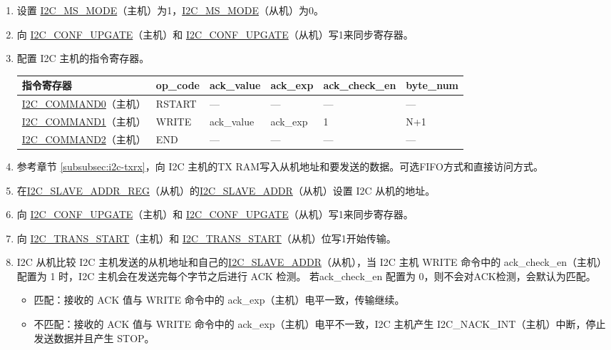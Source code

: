 \documentclass[main\_\_CN.tex]{subfiles}
\begin{document}
\begin{enumerate}
\item 设置 \hyperref[fielddesc:I2CMSMODE]{I2C\_MS\_MODE}（主机）为1，\hyperref[fielddesc:I2CMSMODE]{I2C\_MS\_MODE}（从机）为0。
\item 向 \hyperref[fielddesc:I2CCONFUPGATE]{I2C\_CONF\_UPGATE}（主机）和 \hyperref[fielddesc:I2CCONFUPGATE]{I2C\_CONF\_UPGATE}（从机）写1来同步寄存器。
\item 配置 I2C 主机的指令寄存器。
\begin{longtable}{ | p{4cm} | p{2cm} | p{2cm} | p{2cm} |p{2cm} | p{2cm} |}
\hline\rowcolor{lightgray}
指令寄存器& op\_code & ack\_value&ack\_exp&ack\_check\_en&byte\_num  \\ \hline
\hyperref[fielddesc:I2CCOMMAND0]{I2C\_COMMAND0}（主机）& RSTART& ---&---&---&---  \\ \hline
\hyperref[fielddesc:I2CCOMMAND1]{I2C\_COMMAND1}（主机）& WRITE& ack\_value&ack\_exp&1&N+1  \\ \hline
\hyperref[fielddesc:I2CCOMMAND2]{I2C\_COMMAND2}（主机）& END& ---&---&---&---  \\ \hline
\end{longtable}
\item 参考章节 \ref{subsubsec:i2c-txrx}，向 I2C 主机的TX RAM写入从机地址和要发送的数据。可选FIFO方式和直接访问方式。
\item 在\hyperref[regdesc:I2CSLAVEADDRREG]{I2C\_SLAVE\_ADDR\_REG}（从机）的\hyperref[fielddesc:I2CSLAVEADDR]{I2C\_SLAVE\_ADDR}（从机）设置 I2C 从机的地址。
\item 向 \hyperref[fielddesc:I2CCONFUPGATE]{I2C\_CONF\_UPGATE}（主机）和 \hyperref[fielddesc:I2CCONFUPGATE]{I2C\_CONF\_UPGATE}（从机）写1来同步寄存器。
\item 向 \hyperref[fielddesc:I2CTRANSSTART]{I2C\_TRANS\_START}（主机）和 \hyperref[fielddesc:I2CTRANSSTART]{I2C\_TRANS\_START}（从机）位写1开始传输。
\item I2C 从机比较 I2C 主机发送的从机地址和自己的\hyperref[fielddesc:I2CSLAVEADDR]{I2C\_SLAVE\_ADDR}（从机），当 I2C 主机 WRITE 命令中的 ack\_check\_en（主机）配置为 1 时，I2C 主机会在发送完每个字节之后进行 ACK 检测。 若ack\_check\_en 配置为 0，则不会对ACK检测，会默认为匹配。
\begin{itemize}
\item 匹配：接收的 ACK 值与 WRITE 命令中的 ack\_exp（主机）电平一致，传输继续。
\item 不匹配：接收的 ACK 值与 WRITE 命令中的 ack\_exp（主机）电平不一致，I2C 主机产生 I2C\_NACK\_INT（主机）中断，停止发送数据并且产生 STOP。
\end{itemize}


\end{enumerate}
\end{document}
